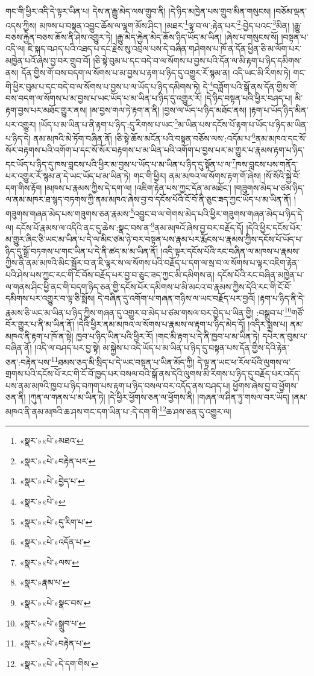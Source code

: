 གང་གི་ཕྱིར་འདི་དེ་ལྟར་ཡིན་པ། དེས་ན་རྒྱུ་མེད་ལས་གྲུབ་ནི། །དེ་ཉིད་མཁྱེན་པས་གྲུབ་མིན་གསུངས། །བཅོམ་ལྡན་འདས་ཀྱིས། མཁས་པ་བསྟན་འབྱུང་ཆོས་ལ་ལྷག་མོས་ཤིང་། །མཐར་\footnote{«སྣར་»«པེ་»མཐའ་}ལྟ་བ་ལ་:རྟེན་པར་\footnote{«སྣར་»«པེ་»བརྟེན་པར་}:བྱེད་པའང་\footnote{«སྣར་»«པེ་»བྱེད་པ་}མིན། །རྒྱུ་བཅས་རྐྱེན་བཅས་ཆོས་ནི་ཤེས་འགྱུར་ཏེ། །རྒྱུ་མེད་རྐྱེན་མེད་ཆོས་ཉིད་ཡོད་མ་ཡིན། །ཞེས་པ་གསུངས་སོ། །བསྟན་པ་འདི་ལ། ཇི་སྐད་བཤད་པའི་འཐད་པ་དང་རྗེས་སུ་འབྲེལ་པས་དེ་བཞིན་གཤེགས་པ་ཁོ་ན་དོན་ཕྱིན་ཅི་མ་ལོག་པར་མཁྱེན་པའོ་ཞེས་བྱ་བར་གྲུབ་བོ། །ཅི་སྟེ་བུམ་པ་དང་བདེ་བ་ལ་སོགས་པ་བྱས་པའི་དོན་ལ་མི་རྟག་པ་ཉིད་དམིགས་ནས། དོན་གྱིས་གོ་བས་བདག་ལ་སོགས་པ་མ་བྱས་པ་རྟག་པ་ཉིད་དུ་འགྱུར་རོ་སྙམ་ན། འདི་ཡང་མི་རིགས་ཏེ། གང་གི་ཕྱིར་བུམ་པ་དང་བདེ་བ་ལ་སོགས་པ་བྱས་པ་ལ་ཡོད་པ་ཉིད་དམིགས་ཏེ། དེ་\footnote{«སྣར་»«པེ་»}བཟློག་པའི་སྒོ་ནས་དོན་གྱིས་གོ་བས་བདག་ལ་སོགས་པ་མ་བྱས་པ་ཡང་ཡོད་པ་མ་ཡིན་པ་ཉིད་དུ་འགྱུར་རོ། །དེ་ཉིད་བསྟན་པའི་ཕྱིར་བཤད་པ། མི་རྟག་བྱས་པར་མཐོང་གྱུར་ནས། །མ་བྱས་གལ་ཏེ་རྟག་ན་ནི། །བྱས་ལ་ཡོད་པ་ཉིད་མཐོང་ནས། །རྟག་པ་ཡོད་ཉིད་མིན་པར་འགྱུར། །ཡོད་པ་མ་ཡིན་པ་ནི་རྟག་པ་ཉིད་:དུ་རིགས་པ་ཡང་\footnote{«སྣར་»«པེ་»དུ་རིག་པ་}མ་ཡིན་པས་དངོས་པོ་རྟག་པ་ཡོད་པ་ཉིད་མ་ཡིན་པ་ཉིད་དེ། ནམ་མཁའི་མེ་ཏོག་བཞིན་ནོ། །ཅི་སྟེ་ཆོས་མངོན་པའི་བསྟན་བཅོས་ལས་:འདོམ་པ་\footnote{«སྣར་»«པེ་»འདོན་པ་}ནམ་མཁའ་དང་སོ་སོར་བརྟགས་པའི་འགོག་པ་དང་སོ་སོར་བརྟགས་པ་མ་ཡིན་པའི་འགོག་པ་བྱས་པར་མ་གྱུར་པ་རྣམས་རྟག་པ་ཉིད་དང་ཡོད་པ་ཉིད་དུ་ཁས་བླངས་པའི་ཕྱིར་མ་བྱས་པ་ཡོད་པ་མ་ཡིན་པ་ཉིད་དུ་སྟོན་པ་ལ་\footnote{«སྣར་»«པེ་»ལས་}ཁས་བླངས་པས་གནོད་པར་འགྱུར་རོ་སྙམ་ན་དེ་ཡང་ཡོད་པ་མ་ཡིན་ཏེ། གང་གི་ཕྱིར། ནམ་མཁའ་ལ་སོགས་རྟག་གོ་ཞེས། །སོ་སོའི་སྐྱེ་བོ་དག་གིས་རྟོག །མཁས་པ་རྣམས་ཀྱིས་དེ་དག་ལ། །འཇིག་རྟེན་པས་ཀྱང་དོན་མ་མཐོང་། །གཟུགས་མེད་པ་ཙམ་ཉིད་ལ་ནམ་མཁར་ཐ་སྙད་བཏགས་ཀྱི་ནམ་མཁའ་ཞེས་བྱ་བ་དངོས་པོའི་ངོ་བོ་ནི་ཅུང་ཟད་ཀྱང་ཡོད་པ་མ་ཡིན་ནོ། །གཟུགས་གཞན་མེད་པས་གཟུགས་ཅན་རྣམས་\footnote{«སྣར་»རྣམ་པ་}འབྱུང་བ་ལ་གེགས་མེད་པའི་ཕྱིར་གཟུགས་གཞན་མེད་པ་ཉིད་དེ་ལ། དངོས་པོ་རྣམས་ལ་འདིའི་ནང་དུ་ཆེས་:སྣང་བས་ན་\footnote{«སྣར་»«པེ་»སྣང་བས་}ནམ་མཁའོ་ཞེས་བྱ་བར་བརྗོད་དོ། །དེའི་ཕྱིར་དངོས་པོར་མ་གྱུར་ཞིང་ཅི་ཡང་མ་ཡིན་པ་དེ་ལ་མིང་ཙམ་ཉེ་བར་བསྟན་པས་རྣམ་པར་རྨོངས་པ་རྣམས་ཀྱིས་དངོས་པོ་ཡོད་པ་ཉིད་དུ་སྒྲོ་བཏགས་པ་གང་ཡིན་པ་དེ་ནི་ཚད་མ་མ་ཡིན་ནོ། །འདི་ལྟར་དངོས་པོའི་རང་བཞིན་ལ་མཁས་པ་རྣམས་ཀྱིས་ནི་ནམ་མཁའི་མིང་སྦྱོར་བ་ན་ཇི་ལྟར་ས་ལ་སོགས་པའི་བརྗོད་པ་དག་ལ་སྲ་བ་ལ་སོགས་པ་ལྟར་འཇིག་རྟེན་པའི་ཤེས་པས་ཀྱང་རང་གི་ངོ་བོས་བརྗོད་པར་བྱ་བ་ཅུང་ཟད་ཀྱང་མི་དམིགས་ན། དངོས་པོའི་རང་བཞིན་མཁྱེན་པ་ལ་གནས་ཤིང་ཕྱི་ནང་གི་བདག་ཉིད་ཅན་གྱི་དངོས་པོར་དམིགས་པ་མི་མངའ་བ་རྣམས་ཀྱིས་དེའི་རང་གི་ངོ་བོ་དམིགས་པར་འགྱུར་བ་ལྟ་ཅི་སྨོས། དེ་བཞིན་དུ་འགོག་པ་གཞན་གཉིས་ལ་ཡང་བརྗོད་པར་བྱའོ། །རྟག་པ་ཉིད་ནི་དེ་རྣམས་ཅི་ཡང་མ་ཡིན་པ་ཉིད་ཀྱིས་གཞན་དུ་འགྱུར་བ་མེད་པ་ཙམ་གསལ་བར་བྱེད་པ་ཡིན་གྱི། :བསྒྲུབ་པ་\footnote{«སྣར་»«པེ་»སྒྲུབ་པ་}གཙོ་བོར་གྱུར་པ་ནི་མ་ཡིན་ནོ། །དེའི་ཕྱིར་ནམ་མཁའ་ལ་སོགས་པ་རྣམས་ལ་རྟག་པ་ཉིད་མེད་དོ། །འདིར་སྨྲས་པ། ནམ་མཁའ་ནི་རྟག་པ་ཁོ་ན་སྟེ། ཁྱབ་པ་ཉིད་ཡིན་པའི་ཕྱིར་རོ། །གང་མི་རྟག་པ་དེ་ནི་ཁྱབ་པ་མ་ཡིན་ཏེ། དཔེར་ན་བུམ་པ་བཞིན་ནོ། །འདི་ལ་བཤད་པར་བྱ་སྟེ། མ་སྐྱེས་པ་འདི་ཡོད་པ་མ་ཡིན་པ་ཉིད་དུ་བསྟན་པས་དོན་གྱིས་དེའི་རྟེན་ཅན་:བརྟེན་པས་\footnote{«སྣར་»«པེ་»བརྟེན་པ་}ཐམས་ཅད་མི་སྲིད་པ་དེ་ཡང་བསྟན་པ་ཡིན་མོད་ཀྱི། དེ་ལྟ་ན་ཡང་ཕ་རོལ་པོའི་ལུགས་ལ་གྲགས་པའི་དངོས་པོ་རང་གི་ངོ་བོ་ཁྱད་པར་བསལ་བའི་སྒོ་ནས་དེའི་ལུགས་མི་རིགས་པ་ཉིད་དུ་བརྗོད་པར་འདོད་པས་ནམ་མཁའི་ཁྱབ་པ་ཉིད་བཀག་པས་རྟག་པ་ཉིད་བསལ་བར་འདོད་ནས་བཤད་པ། ཕྱོགས་ཞེས་བྱ་བ་ཕྱོགས་ཅན་ནི། །ཀུན་ལ་གནས་པ་མ་ཡིན་ཏེ། །དེ་ཕྱིར་ཕྱོགས་ཅན་ལ་ཕྱོགས་ནི། །གཞན་ལ་ཤིན་ཏུ་གསལ་བར་ཡོད། །ནམ་མཁའ་ནི་ནམ་མཁའི་ཆ་ཤས་གང་དག་ཡིན་པ་:དེ་དག་གི་\footnote{«སྣར་»«པེ་»དེ་དག་གིས་}ཆ་ཤས་ཅན་དུ་འགྱུར་ལ། 